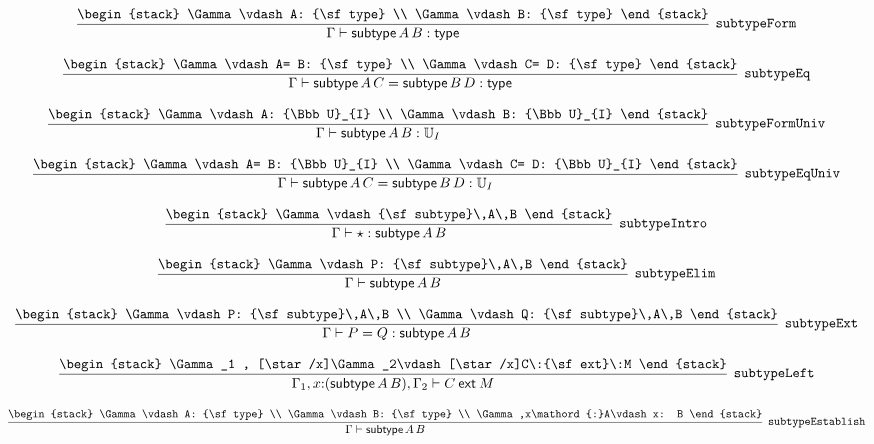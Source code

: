 \[
\infer[{\tt subtypeForm}]{\Gamma \vdash {\sf subtype}\,A\,B: {\sf type}}{
\begin{stack}
\Gamma \vdash A: {\sf type}
\\
\Gamma \vdash B: {\sf type}
\end{stack}}
\]

\[
\infer[{\tt subtypeEq}]{\Gamma \vdash {\sf subtype}\,A\,C= {\sf subtype}\,B\,D: {\sf type}}{
\begin{stack}
\Gamma \vdash A= B: {\sf type}
\\
\Gamma \vdash C= D: {\sf type}
\end{stack}}
\]

\[
\infer[{\tt subtypeFormUniv}]{\Gamma \vdash {\sf subtype}\,A\,B: {\Bbb U}_{I}}{
\begin{stack}
\Gamma \vdash A: {\Bbb U}_{I}
\\
\Gamma \vdash B: {\Bbb U}_{I}
\end{stack}}
\]

\[
\infer[{\tt subtypeEqUniv}]{\Gamma \vdash {\sf subtype}\,A\,C= {\sf subtype}\,B\,D: {\Bbb U}_{I}}{
\begin{stack}
\Gamma \vdash A= B: {\Bbb U}_{I}
\\
\Gamma \vdash C= D: {\Bbb U}_{I}
\end{stack}}
\]

\[
\infer[{\tt subtypeIntro}]{\Gamma \vdash \star : {\sf subtype}\,A\,B}{
\begin{stack}
\Gamma \vdash {\sf subtype}\,A\,B
\end{stack}}
\]

\[
\infer[{\tt subtypeElim}]{\Gamma \vdash {\sf subtype}\,A\,B}{
\begin{stack}
\Gamma \vdash P: {\sf subtype}\,A\,B
\end{stack}}
\]

\[
\infer[{\tt subtypeExt}]{\Gamma \vdash P= Q: {\sf subtype}\,A\,B}{
\begin{stack}
\Gamma \vdash P: {\sf subtype}\,A\,B
\\
\Gamma \vdash Q: {\sf subtype}\,A\,B
\end{stack}}
\]

\[
\infer[{\tt subtypeLeft}]{\Gamma_1 ,x\mathord{:}({\sf subtype}\,A\,B), \Gamma_2 \vdash C\:{\sf ext}\:M}{
\begin{stack}
\Gamma_1 , [\star /x]\Gamma_2\vdash [\star /x]C\:{\sf ext}\:M
\end{stack}}
\]

\[
\infer[{\tt subtypeEstablish}]{\Gamma \vdash {\sf subtype}\,A\,B}{
\begin{stack}
\Gamma \vdash A: {\sf type}
\\
\Gamma \vdash B: {\sf type}
\\
\Gamma ,x\mathord{:}A\vdash x: B
\end{stack}}
\]

